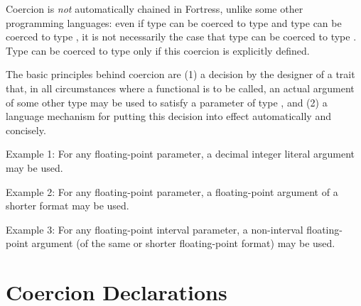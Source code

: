 
Coercion is \emph{not} automatically chained in Fortress, unlike some
other programming languages: even if type  can be coerced to
type  and type  can be coerced to type , it is
not necessarily the case that type  can be coerced to type
.  Type  can be coerced to type  only if this
coercion is explicitly defined.

The basic principles behind coercion are (1) a decision by the
designer of a trait  that, in all circumstances where a
functional is to be called, an actual argument of some other type
 may be used to satisfy a parameter of type
, and (2) a language mechanism for putting this decision into
effect automatically and concisely.

Example 1: For any floating-point parameter, a decimal integer literal
argument may be used.

Example 2: For any floating-point parameter, a floating-point argument
of a shorter format may be used.

Example 3: For any floating-point interval parameter, a non-interval
floating-point argument (of the same or shorter floating-point format) may be used.



\section{Coercion Declarations}

